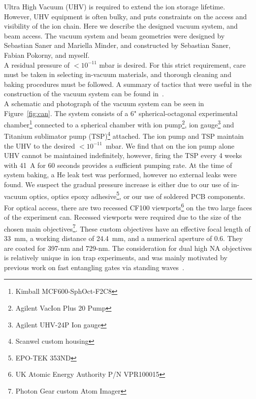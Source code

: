     Ultra High Vacuum (UHV) is required to extend the ion storage lifetime.
    However, UHV equipment is often bulky, and puts constraints on the access
    and visibility of the ion chain. Here we describe the designed vacuum
    system, and beam access.  The vacuum system and beam geometries were
    designed by Sebastian Saner and Mariella Minder, and constructed by
    Sebastian Saner, Fabian Pokorny, and myself.\\
    
    A residual pressure of $<10^{-11}$ mbar is desired. For this strict
    requirement, care must be taken in selecting in-vacuum materials, and 
    thorough cleaning and baking procedures must be followed. A summary of tactics that were
    useful in the construction of the vacuum system can be found
    in~\cite{birnbaum_ultra-high_2005, wolf_cryogenic_2019}.\\
    A schematic and photograph of the vacuum system can be seen in
    Figure~\ref{fig:can}. The system consists of a 6" spherical-octagonal
    experimental chamber\footnote{Kimball MCF600-SphOct-F2C8} connected to a
    spherical chamber with ion pump\footnote{Agilent VacIon Plus 20 Pump}, ion
    gauge\footnote{Agilent UHV-24P Ion gauge} and Titanium sublimator pump
    (TSP)\footnote{Scanwel custom housing} attached. The ion pump and TSP
    maintain the UHV to the desired $<10^{-11}$~mbar. We find that on the ion
    pump alone UHV cannot be maintained indefinitely, however, firing the TSP
    every 4 weeks with 41~A for 60 seconds provides a sufficient pumping rate.
    At the time of system baking, a He leak test was performed, however 
    no external leaks were found. We suspect the gradual pressure increase is either due
    to our use of in-vacuum optics, optics epoxy adhesive\footnote{EPO-TEK
    353ND}, or our use of soldered PCB components.\\
    For optical access, there are two recessed CF100 viewports\footnote{UK Atomic
    Energy Authority P/N VPR100015} on the two large faces of the experiment
    can. Recessed viewports were required due to the size of the chosen main
    objectives\footnote{Photon Gear custom Atom Imager}. These custom objectives
    have an effective focal length of 33~mm, a working distance of 24.4~mm, and
    a numerical aperture of 0.6. They are coated for 397-nm and 729-nm.
    The consideration for dual high NA objectives is relatively unique in ion trap experiments, and was mainly motivated by previous work on fast entangling gates via standing waves~\cite{saner_breaking_2023}. \\
